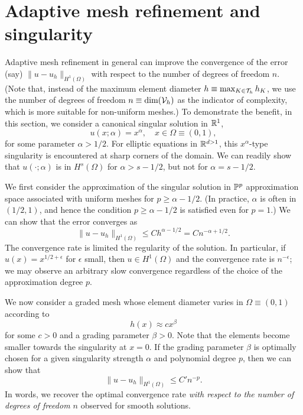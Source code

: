 \section{Adaptive mesh refinement and singularity}
\label{sec:adapt_singularity}
Adaptive mesh refinement in general can improve the convergence of the error (say) $\| u - u_h \|_{H^1(\Omega)}$ with respect to the number of degrees of freedom $n$.  (Note that, instead of the maximum element diameter $h \equiv \max_{K \in \mathcal{T}_h} h_K$, we use the number of degrees of freedom $n \equiv \text{dim}(\mathcal{V}_h)$ as the indicator of complexity, which is more suitable for non-uniform meshes.)  To demonstrate the benefit, in this section, we consider a canonical singular solution in $\mathbb{R}^1$, 
\begin{equation*}
  u(x;\alpha) = x^\alpha, \quad x \in \Omega \equiv (0,1),
\end{equation*}
for some parameter $\alpha > 1/2$. For elliptic equations in $\mathbb{R}^{d > 1}$, this $x^\alpha$-type singularity is encountered at sharp corners of the domain.  We can readily show that $u(\cdot;\alpha)$ is in $H^s(\Omega)$ for $\alpha > s - 1/2$, but not for $\alpha = s - 1/2$.

We first consider the approximation of the singular solution in $\mathbb{P}^p$ approximation space associated with uniform meshes for $p \geq \alpha - 1/2$.  (In practice, $\alpha$ is often in $(1/2,1)$, and hence the condition $p \geq \alpha - 1/2$ is satisfied even for $p = 1$.)  We can show that the error converges as
\begin{equation}
  \| u - u_h \|_{H^1(\Omega)} \leq C h^{\alpha - 1/2} = C n^{-\alpha + 1/2}.
  \label{eq:adapt_singular_uni}
\end{equation}
 The convergence rate is limited the regularity of the solution. In particular, if $u(x) = x^{1/2 + \epsilon}$ for $\epsilon$ small, then $u \in H^1(\Omega)$ and the convergence rate is $n^{-\epsilon}$; we may observe an arbitrary slow convergence regardless of the choice of the approximation degree $p$.

We now consider a graded mesh whose element diameter varies in $\Omega \equiv (0,1)$ according to
\begin{equation*}
  h(x) \approx c x^{\beta}
\end{equation*}
for some $c > 0$ and a grading parameter $\beta > 0$.  Note that the elements become smaller towards the singularity at $x = 0$.  If the grading parameter $\beta$ is optimally chosen for a given singularity strength $\alpha$ and polynomial degree $p$, then we can show that
\begin{equation}
  \| u - u_h \|_{H^1(\Omega)} \leq C' n^{-p}.
  \label{eq:adapt_singular_graded}
\end{equation}
In words, we recover the optimal convergence rate \emph{with respect to the number of degrees of freedom $n$} observed for smooth solutions.

